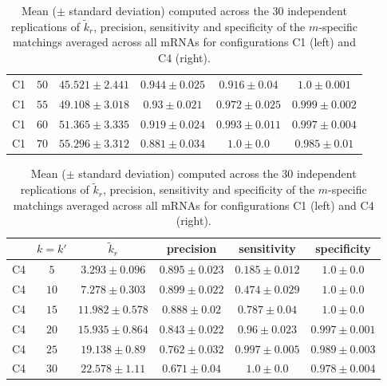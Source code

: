 \begin{table}
{\begin{minipage}{.5\linewidth}
\begin{tabular}{c|c|c|c|c|c}
        C1 &$ 50 $&$ 45.521 \pm 2.441 $&$ 0.944 \pm 0.025 $&$ 0.916 \pm 0.04 $&$ 1.0 \pm 0.001 $\\
        C1 &$ 55 $&$ 49.108 \pm 3.018 $&$ 0.93 \pm 0.021 $&$ 0.972 \pm 0.025 $&$ 0.999 \pm 0.002 $\\
        C1 &$ 60 $&$ 51.365 \pm 3.335 $&$ 0.919 \pm 0.024 $&$ 0.993 \pm 0.011 $&$ 0.997 \pm 0.004 $\\
        C1 &$ 70  $&$ 55.296 \pm 3.312 $&$  0.881 \pm 0.034 $&$ 1.0 \pm  0.0 $&$ 0.985
                                                                                \pm  0.01
                                                                                $\\
        \hline
      \end{tabular}
  \end{minipage}    
    \begin{minipage}{.5\linewidth}
      \centering
      \begin{tabular}{c|c|c|c|c|c}
        & $k=k'$ & $\tilde{k}_r$ & precision & sensitivity & specificity\\
        \hline
        C4&$ 5 $&$ 3.293 \pm 0.096 $&$ 0.895 \pm 0.023 $&$ 0.185 \pm 0.012 $&$ 1.0 \pm 0.0 $\\
        C4&$ 10 $&$ 7.278 \pm 0.303 $&$ 0.899 \pm 0.022 $&$ 0.474 \pm 0.029 $&$ 1.0 \pm 0.0 $\\
        C4&$ 15 $&$ 11.982 \pm 0.578 $&$ 0.888 \pm 0.02 $&$ 0.787 \pm 0.04 $&$ 1.0 \pm 0.0 $\\
        C4&$ 20 $&$ 15.935 \pm 0.864 $&$ 0.843 \pm 0.022 $&$ 0.96 \pm 0.023 $&$ 0.997 \pm 0.001 $\\
        C4&$ 25 $&$ 19.138 \pm 0.89 $&$ 0.762 \pm 0.032 $&$ 0.997 \pm 0.005 $&$ 0.989 \pm 0.003 $\\
        C4&$ 30 $&$ 22.578 \pm 1.11 $&$ 0.671 \pm 0.04 $&$ 1.0 \pm 0.0 $&$ 0.978 \pm 0.004 $\\
        \hline
      \end{tabular}
    \end{minipage}
  \caption{Mean ($\pm$ standard deviation)  computed across the 30 independent
    replications of $\tilde{k}_{r}$, precision, sensitivity and specificity of
    the $m$-specific matchings averaged across all mRNAs for configurations C1
    (left) and C4 (right).  \label{tab:simulC34:results:matching}}



}
\end{table}
